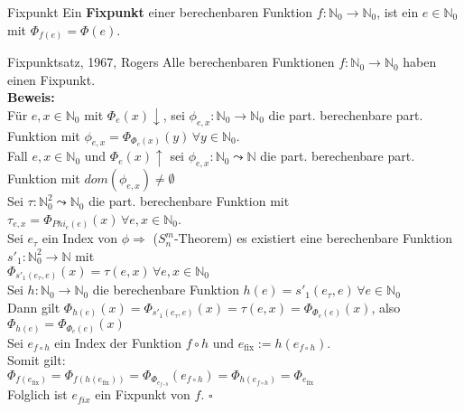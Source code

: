 \begin{defn}{Fixpunkt}
    Ein \textbf{Fixpunkt} einer berechenbaren Funktion $f: \mathbb{N}_0 \rightarrow \mathbb{N}_0$, ist ein 
    $e \in \mathbb{N}_0$ mit $\Phi_{f(e)} = \Phi(e)$.
\end{defn}

\begin{satz}{Fixpunktsatz, 1967, Rogers}
    Alle berechenbaren Funktionen $f: \mathbb{N}_0 \rightarrow \mathbb{N}_0$ haben einen Fixpunkt. \\

    \textbf{Beweis:} \\
    Für $e,x \in \mathbb{N}_0$ mit $\Phi_e(x)\downarrow$, sei $\phi_{e,x} : \mathbb{N}_0 \rightarrow \mathbb{N}_0$ die 
    part. berechenbare part. Funktion mit $\phi_{e,x} = \Phi_{\Phi_e(x)}(y) \, \forall y \in \mathbb{N}_0$. \\
    Fall $e,x \in \mathbb{N}_0$ und $\Phi_e(x)\uparrow$ sei $\phi_{e,x}: \mathbb{N}_0 \leadsto \mathbb{N}$ die part. berechenbare part.
    Funktion mit $dom(\phi_{e,x}) \neq \emptyset$ \\

    Sei $\tau : \mathbb{N}_0^2 \leadsto \mathbb{N}_0$ die part. berechenbare Funktion mit  $\tau_{e,x} = \Phi_{Phi_e(e)}(x) \,
    \forall e,x \in \mathbb{N}_0$. \\

    Sei $e_\tau$ ein Index von $\phi \Rightarrow$ ($S^m_n$-Theorem) es existiert eine berechenbare Funktion
    $s'_1: \mathbb{N}_0^2 \rightarrow \mathbb{N}$ mit \\
    $\Phi_{s'_1(e_\tau,e)}(x) = \tau(e,x) \, \forall e,x \in \mathbb{N}_0$ \\

    Sei $h: \mathbb{N}_0 \rightarrow \mathbb{N}_0$ die berechenbare Funktion $h(e) = s'_1(e_\tau,e) \, \forall e \in \mathbb{N}_0$ \\
    Dann gilt $\Phi_{h(e)}(x) = \Phi_{s'_1(e_\tau,e)}(x) = \tau(e,x) = \Phi_{\Phi_e(e)}(x)$, also \\
    $\Phi_{h(e)} = \Phi_{\Phi_e(e)}(x)$ \\

    Sei $e_{f \circ h}$ ein Index der Funktion $f \circ h$ und $e_{\text{fix}}:=h(e_{f \circ h})$. \\
    Somit gilt: \\
    $\Phi_{f(e_{\text{fix}})} = \Phi_{f(h(e_{\text{fix}}))} = \Phi_{\Phi_{e_{f \circ h}}}(e_{f \circ h}) = \Phi_{h(e_{f \circ h})} = \Phi_{e_{\text{fix}}}$ \\

    Folglich ist $e_{fix}$ ein Fixpunkt von $f$. $\square$
\end{satz}

